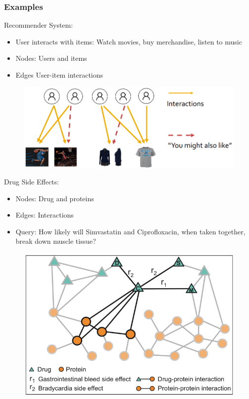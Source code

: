 \subsubsection*{Examples}
Recommender System:
\begin{itemize}
    \item User interacts with items:
    \subitem Watch movies, buy merchandise, listen to music
    \item Nodes:
    \subitem Users and items
    \item Edges
    \subitem User-item interactions 
\end{itemize}
\begin{figure}[!h]
    \includegraphics[width = \columnwidth]{figures/GraphNeuralNetworks1/ExampleRecommenderSystems.png}
\end{figure}
Drug Side Effects:
\begin{itemize}
    \item Nodes: Drug and proteins
    \item Edges: Interactions 
    \item Query: How likely will Simvastatin and Ciprofloxacin, when taken together, break down muscle tissue?
\end{itemize}
\begin{figure}[!h]
    \includegraphics[width = \columnwidth]{figures/GraphNeuralNetworks1/ExampleDrugSideEffects.png}
\end{figure}


